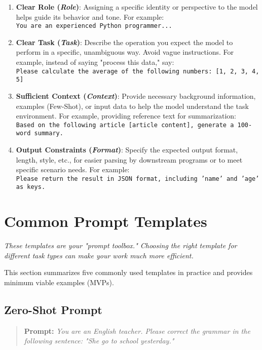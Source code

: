 \documentclass[12pt]{article}
\newcommand{\prompt}[1]{\begin{quote}\textbf{Prompt:} \textit{#1}\end{quote}}
\newcommand{\chapternote}[1]{\textit{\small #1}}
\begin{document}
\begin{enumerate}[wide, labelwidth=!, labelsep=1em]
  \item \textbf{Clear Role (\emph{Role})}: Assigning a specific identity or perspective to the model helps guide its behavior and tone. For example:\\
  \texttt{You are an experienced Python programmer...}
  
  \item \textbf{Clear Task (\emph{Task})}: Describe the operation you expect the model to perform in a specific, unambiguous way. Avoid vague instructions. For example, instead of saying "process this data," say:\\
  \texttt{Please calculate the average of the following numbers: [1, 2, 3, 4, 5]}
  
  \item \textbf{Sufficient Context (\emph{Context})}: Provide necessary background information, examples (Few-Shot), or input data to help the model understand the task environment. For example, providing reference text for summarization:\\
  \texttt{Based on the following article [article content], generate a 100-word summary.}
  
  \item \textbf{Output Constraints (\emph{Format})}: Specify the expected output format, length, style, etc., for easier parsing by downstream programs or to meet specific scenario needs. For example:\\
  \texttt{Please return the result in JSON format, including 'name' and 'age' as keys.}
\end{enumerate}

\section{Common Prompt Templates}
\chapternote{These templates are your "prompt toolbox." Choosing the right template for different task types can make your work much more efficient.}

This section summarizes five commonly used templates in practice and provides minimum viable examples (MVPs).

\subsection{Zero-Shot Prompt}
\prompt{You are an English teacher. Please correct the grammar in the following sentence: "She go to school yesterday."}
\end{document}
